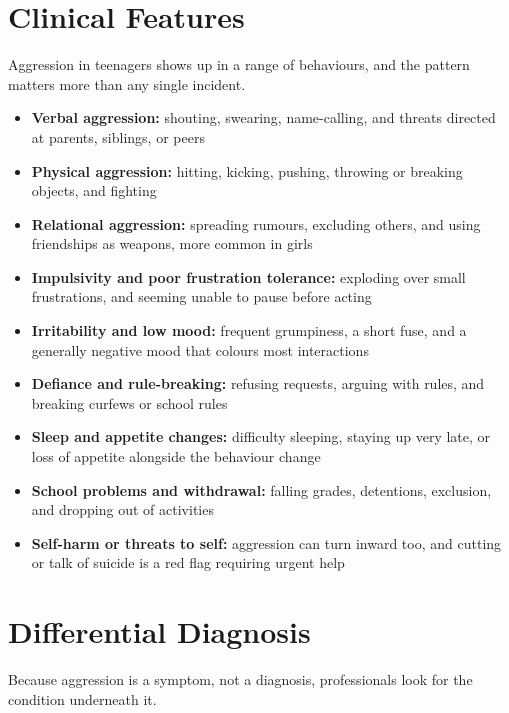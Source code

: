 \section*{Clinical Features}
Aggression in teenagers shows up in a range of behaviours, and the pattern matters more than any single incident.

\begin{itemize}
    \item \textbf{Verbal aggression:} shouting, swearing, name-calling, and threats directed at parents, siblings, or peers
    \item \textbf{Physical aggression:} hitting, kicking, pushing, throwing or breaking objects, and fighting
    \item \textbf{Relational aggression:} spreading rumours, excluding others, and using friendships as weapons, more common in girls
    \item \textbf{Impulsivity and poor frustration tolerance:} exploding over small frustrations, and seeming unable to pause before acting
    \item \textbf{Irritability and low mood:} frequent grumpiness, a short fuse, and a generally negative mood that colours most interactions
    \item \textbf{Defiance and rule-breaking:} refusing requests, arguing with rules, and breaking curfews or school rules
    \item \textbf{Sleep and appetite changes:} difficulty sleeping, staying up very late, or loss of appetite alongside the behaviour change
    \item \textbf{School problems and withdrawal:} falling grades, detentions, exclusion, and dropping out of activities
    \item \textbf{Self-harm or threats to self:} aggression can turn inward too, and cutting or talk of suicide is a red flag requiring urgent help
\end{itemize}

\section*{Differential Diagnosis}
Because aggression is a symptom, not a diagnosis, professionals look for the condition underneath it.

